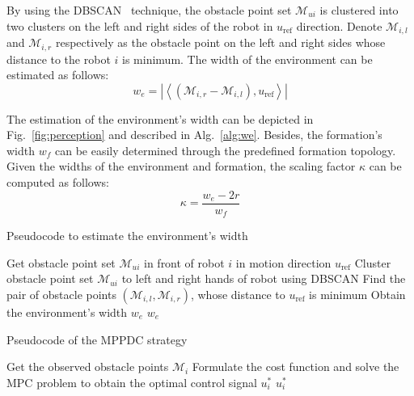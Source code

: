 By using the DBSCAN~\cite{10.5555/3001460.3001507} technique, the obstacle point set $\mathcal{M}_{ui}$ is clustered into two clusters on the left and right sides of the robot in $u_\text{ref}$ direction. Denote $\mathcal{M}_{i,l}$ and $\mathcal{M}_{i,r}$ respectively as the obstacle point on the left and right sides whose distance to the robot $i$ is minimum. The width of the environment can be estimated as follows:
\begin{equation}
    w_e= \left\vert\left\langle\left(\mathcal{M}_{i,r}-\mathcal{M}_{i,l}\right),u_\text{ref}\right\rangle\right\vert
    \label{eqn:we}
\end{equation}

The estimation of the environment's width can be depicted in Fig.~\ref{fig:perception} and described in Alg.~\ref{alg:we}. Besides, the formation's width $w_f$ can be easily determined through the predefined formation topology. Given the widths of the environment and formation, the scaling factor $\kappa$ can be computed as follows:
\begin{equation}
    \kappa=\dfrac{w_e-2r}{w_f}
    \label{eqn:kappa}
\end{equation}


\begin{algorithm}
\caption{Pseudocode to estimate the environment's width}
\label{alg:we}
Get obstacle point set $\mathcal{M}_{ui}$ in front of robot $i$ in motion direction $u_\text{ref}$
Cluster obstacle point set $\mathcal{M}_{ui}$ to left and right hands of robot using DBSCAN\;
Find the pair of obstacle points $\left(\mathcal{M}_{i,l},\mathcal{M}_{i,r}\right)$, whose distance to $u_\text{ref}$ is minimum\;
Obtain the environment's width $w_e$
\Return $w_e$\;
\end{algorithm}

\begin{algorithm}[h!]
\caption{Pseudocode of the MPPDC strategy}
\label{alg:our}
Get the observed obstacle points $\mathcal{M}_i$\;
Formulate the cost function and solve the MPC problem to obtain the optimal control signal $u_i^*$
\Return $u_i^*$\;
\end{algorithm}

